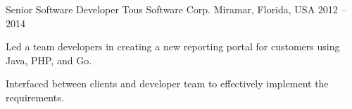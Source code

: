 \begin{cventries}
  \cventry
    {Senior Software Developer}
    {Tous Software Corp.}
    {Miramar, Florida, USA}
    {2012 -- 2014}
    {
      \begin{cvitems}
        \item Led a team developers in creating a new reporting portal for
          customers using Java, PHP, and Go.
        \item Interfaced between clients and developer team to effectively
          implement the requirements.
      \end{cvitems}
    }

\end{cventries}
